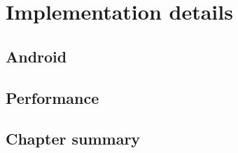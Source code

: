 \chapter{Implementation details} \label{chap:impl}

\section*{}



\section{\evm} \label{sec:impl:evm}

\section{Android} \label{sec:impl:android}

\section{Performance} \label{sec:impl:perf}

\section{Chapter summary}

